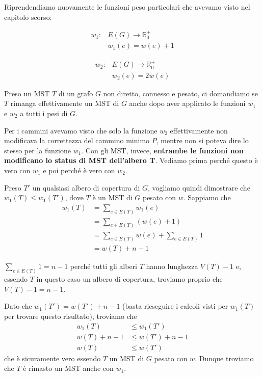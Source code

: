 \documentclass[11pt, a4paper, titlepage, oneside]{scrbook}
\begin{document}
Riprendendiamo nuovamente le funzioni peso particolari che avevamo visto nel capitolo scorso:
\begin{minipage}{0.48\textwidth}
\begin{align*}
w_1: &E(G) \to \mathbb{R}^+_0 \\
 &w_1(e) = w(e) + 1
\end{align*}
\end{minipage}\hfill
\begin{minipage}{0.48\textwidth}
\begin{align*}
w_2: &E(G) \to \mathbb{R}^+_0 \\
&w_2(e) = 2w(e)
\end{align*}
\end{minipage}

Preso un MST $T$ di un grafo $G$ non diretto, connesso e pesato, ci domandiamo se $T$ rimanga effettivamente un MST di $G$ anche dopo aver applicato le funzioni $w_1$ e $w_2$ a tutti i pesi di $G$. 

Per i cammini avevamo visto che solo la funzione $w_2$ effettivamente non modificava la correttezza del cammino minimo $P$, mentre non si poteva dire lo stesso per la funzione $w_1$. Con gli MST, invece, \textbf{entrambe le funzioni non modificano lo status di MST dell'albero T}. Vediamo prima perché questo è vero con $w_1$ e poi perché è vero con $w_2$. 

Preso $T'$ un qualsiasi albero di copertura di $G$, vogliamo quindi dimostrare che $w_1(T) \leq w_1(T')$, dove $T$ è un MST di $G$ pesato con $w$. Sappiamo che 
\begin{align*}
w_1(T) &= \sum_{e \in E(T)} w_1(e) \\
       &= \sum_{e \in E(T)} (w(e) + 1) \\
       &= \sum_{e \in E(T)} w(e) + \sum_{e \in E(T)} 1 \\
       &= w(T) + n-1 
\end{align*}

\NB $\sum_{e \in E(T)} 1 = n-1$ perché tutti gli alberi $T$ hanno lunghezza $V(T) - 1$ e, essendo $T$ in questo caso un albero di copertura, troviamo proprio che $V(T) - 1 = n - 1$.

Dato che $w_1(T') = w(T') + n-1$ (basta rieseguire i calcoli visti per $w_1(T)$ per trovare questo risultato), troviamo che 
\begin{align*}
w_1(T) &\leq w_1(T')  \\
w(T) + n-1 &\leq w(T') + n-1 \\
w(T) &\leq w(T') 
\end{align*}
che è sicuramente vero essendo $T$ un MST di $G$ pesato con $w$. Dunque troviamo che $T$ è rimasto un MST anche con $w_1$.
\end{document}
